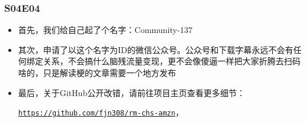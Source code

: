 \documentclass{ctexart}
\begin{document}
\subsubsection{S04E04}\label{gh}

\begin{itemize}
    \item 首先，我们给自己起了个名字：Community-137
    \item 其次，申请了以这个名字为ID的微信公众号。公众号和下载字幕永远不会有任何绑定关系，不会搞什么脑残流量变现，更不会像傻逼一样把大家折腾去扫码啥的，只是解读梗的文章需要一个地方发布
    \item 最后，关于GitHub公开改错，请前往项目主页查看更多细节： 
    
    \href{https://github.com/fjn308/rm-chs-amzn}{\texttt{https://github.com/fjn308/rm-chs-amzn}}，
\end{itemize}
\end{document}
